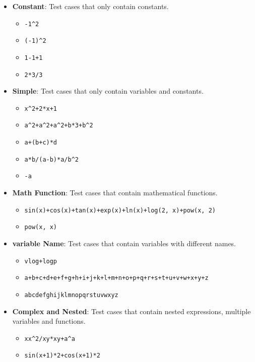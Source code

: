 \documentclass[a4paper,oneside]{book}
\begin{document}
\begin{itemize}
    \item \textbf{Constant}: Test cases that only contain constants.
          \begin{itemize}
              \item \verb|-1^2|
              \item \verb|(-1)^2|
              \item \verb|1-1+1|
              \item \verb|2*3/3|
          \end{itemize}
    \item \textbf{Simple}: Test cases that only contain variables and constants.
          \begin{itemize}
              \item \verb|x^2+2*x+1|
              \item \verb|a^2+a^2+a^2+b*3+b^2|
              \item \verb|a+(b+c)*d|
              \item \verb|a*b/(a-b)*a/b^2|
              \item \verb|-a|
          \end{itemize}
    \item \textbf{Math Function}: Test cases that contain mathematical functions.
          \begin{itemize}
              \item \verb|sin(x)+cos(x)+tan(x)+exp(x)+ln(x)+log(2, x)+pow(x, 2)|
              \item \verb|pow(x, x)|
          \end{itemize}
    \item \textbf{variable Name}: Test cases that contain variables with different names.
          \begin{itemize}
              \item \verb|vlog+logp|
              \item \verb|a+b+c+d+e+f+g+h+i+j+k+l+m+n+o+p+q+r+s+t+u+v+w+x+y+z|
              \item \verb|abcdefghijklmnopqrstuvwxyz|
          \end{itemize}
    \item \textbf{Complex and Nested}: Test cases that contain nested expressions, multiple variables and functions.
          \begin{itemize}
              \item \verb|xx^2/xy*xy+a^a|
              \item \verb|sin(x+1)*2+cos(x+1)*2|

\end{itemize}
\end{itemize}
\end{document}
